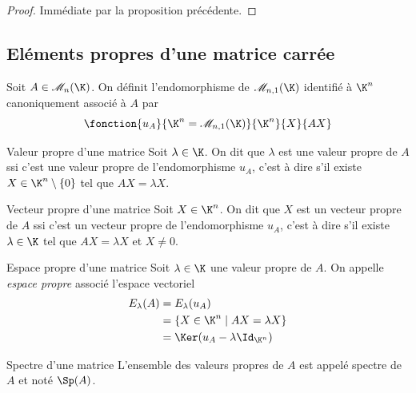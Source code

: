 \begin{proof}
    Immédiate par la proposition précédente. 
\end{proof}

\subsection{Eléments propres d'une matrice carrée }

\begin{definition}{}{}
    Soit $A \in \mathscr M_n(\K)$. On définit l'endomorphisme de $\mathscr M_{n, 1}(\K)$
    identifié à $\K^n$ canoniquement associé à $A$ par 
    $$\fonction{u_A}{\K^n = \mathscr M_{n, 1}(\K)}{\K^n}{X}{AX}$$
\end{definition}

\begin{definition}{Valeur propre d'une matrice}{}
    Soit $\lambda \in \K$. On dit que $\lambda$ est une valeur propre de $A$ ssi
    c'est une valeur propre de l'endomorphisme $u_A$, c'est à dire s'il existe 
    $X \in \K^n \setminus \{0\}$ tel que $AX = \lambda X$.
\end{definition}

\begin{definition}{Vecteur propre d'une matrice}{}
    Soit $X \in \K^n$. On dit que $X$ est un vecteur propre de $A$ ssi
    c'est un vecteur propre de l'endomorphisme $u_A$, c'est à dire s'il existe 
    $\lambda \in \K$ tel que $AX = \lambda X$ et $X \neq 0$.
\end{definition}

\begin{definition}{Espace propre d'une matrice}{}
    Soit $\lambda \in \K$ une valeur propre de $A$. On appelle \emph{espace propre} 
    associé l'espace vectoriel 
    \begin{align} E_\lambda(A) & = E_\lambda(u_A) \\
                        & = \{ X \in \K^n \mid AX = \lambda X \} \\
                        & = \Ker (u_A - \lambda \Id_{\K^n}) 
    \end{align}
\end{definition}

\begin{definition}{Spectre d'une matrice}{}
    L'ensemble des valeurs propres de $A$ est appelé spectre de $A$ 
    et noté $\Sp(A)$.
    
\end{definition}

